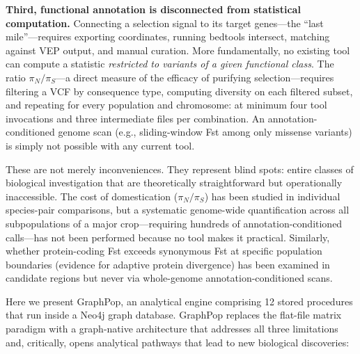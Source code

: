 \textbf{Third, functional annotation is disconnected from statistical computation.} Connecting a selection signal to its target genes---the ``last mile''---requires exporting coordinates, running bedtools intersect\cite{quinlan2010bedtools}, matching against VEP\cite{mclaren2016ensembl} output, and manual curation. More fundamentally, no existing tool can compute a statistic \emph{restricted to variants of a given functional class}. The ratio $\pi_N/\pi_S$---a direct measure of the efficacy of purifying selection\cite{lu2006cost}---requires filtering a VCF by consequence type, computing diversity on each filtered subset, and repeating for every population and chromosome: at minimum four tool invocations and three intermediate files per combination. An annotation-conditioned genome scan (e.g., sliding-window Fst among only missense variants) is simply not possible with any current tool.

These are not merely inconveniences. They represent blind spots: entire classes of biological investigation that are theoretically straightforward but operationally inaccessible. The cost of domestication ($\pi_N/\pi_S$) has been studied in individual species-pair comparisons\cite{lu2006cost}, but a systematic genome-wide quantification across all subpopulations of a major crop---requiring hundreds of annotation-conditioned calls---has not been performed because no tool makes it practical. Similarly, whether protein-coding Fst exceeds synonymous Fst at specific population boundaries (evidence for adaptive protein divergence) has been examined in candidate regions but never via whole-genome annotation-conditioned scans.

Here we present GraphPop, an analytical engine comprising 12 stored procedures that run inside a Neo4j\cite{neo4j} graph database. GraphPop replaces the flat-file matrix paradigm with a graph-native architecture that addresses all three limitations and, critically, opens analytical pathways that lead to new biological discoveries:

